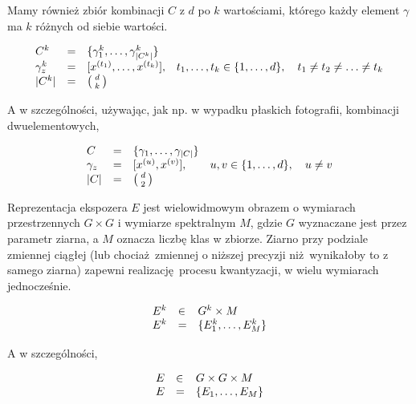 \documentclass[]{article}
\begin{document}
Mamy również zbiór kombinacji $C$ z $d$ po $k$ wartościami, którego każdy element $\gamma$ ma $k$ różnych od siebie wartości.

\begin{equation}
	\begin{array}[b]{llll}
		C^k & = & \{\gamma_1^k, \ldots, \gamma_{|C^k|}^k \}\\
		\gamma_z^k & = & [x^{(t_1)}, \ldots, x^{(t_k)}], & t_1, \ldots, t_k \in \{1, \ldots, d\},\quad t_1\neq t_2 \neq \ldots \neq t_k\\
		|C^k| & = & {\;d\;\choose \;k\;}
	\end{array}
\end{equation}

A w szczególności, używając, jak np. w wypadku płaskich fotografii, kombinacji dwuelementowych,

\begin{equation}
	\begin{array}[b]{llll}
		C & = & \{\gamma_1, \ldots, \gamma_{|C|} \}\\
		\gamma_z & = & [x^{(u)}, x^{(v)}], & u, v \in \{1, \ldots, d\},\quad u\neq v\\
		|C| & = & {\;d\;\choose \;2\;}
	\end{array}
\end{equation}

Reprezentacja ekspozera $E$ jest wielowidmowym obrazem o wymiarach przestrzennych $G\times G$ i wymiarze spektralnym $M$, gdzie $G$ wyznaczane jest przez parametr ziarna, a $M$ oznacza liczbę klas w zbiorze. Ziarno przy podziale zmiennej ciągłej (lub chociaż zmiennej o niższej precyzji niż wynikałoby to z samego ziarna) zapewni realizację procesu kwantyzacji, w wielu wymiarach jednocześnie.

\begin{equation}
	\begin{array}[b]{lll}
		E^k & \in & G^k \times M\\
		E^k & = & \{ E^k_1, \ldots, E^k_M \}
	\end{array}
\end{equation}

A w szczególności,

\begin{equation}
	\begin{array}[b]{lll}
		E & \in & G \times G \times M\\
		E & = & \{ E_1, \ldots, E_M \}\\
	\end{array}
\end{equation}
\end{document}

